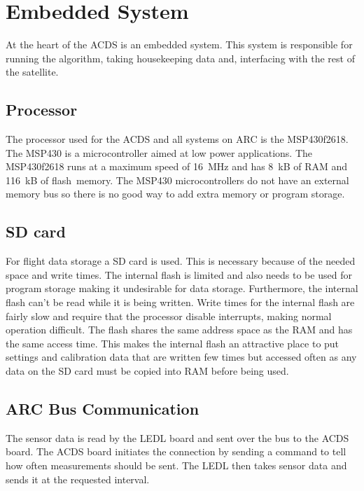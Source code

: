 \section{Embedded System}

At the heart of the \ac{ACDS} is an embedded system. This system is responsible for running the algorithm, taking housekeeping data and, interfacing with the rest of the satellite.

\subsection{Processor}

The processor used for the \ac{ACDS} and all systems on \ac{ARC} is the MSP430f2618. The MSP430 is a microcontroller aimed at low power applications. The MSP430f2618 runs at a maximum speed of 16~MHz and has 8~kB of RAM and 116~kB of flash~memory. The MSP430 microcontrollers do not have an external memory bus so there is no good way to add extra memory or program storage. 

\subsection{SD card}

For flight data storage a SD card is used. This is necessary because of the needed space and write times. The internal flash is limited and also needs to be used for program storage making it undesirable for data storage. Furthermore, the internal flash can't be read while it is being written. Write times for the internal flash are fairly slow and require that the processor disable interrupts, making normal operation difficult. The flash shares the same address space as the \ac{RAM} and has the same access time. This makes the internal flash an attractive place to put settings and calibration data that are written few times but accessed often as any data on the SD card must be copied into \ac{RAM} before being used.

\subsection{\acs{ARC} Bus Communication}

The sensor data is read by the \ac{LEDL} board and sent over the bus to the \ac{ACDS} board. The \ac{ACDS} board initiates the connection by sending a command to tell how often measurements should be sent. The \ac{LEDL} then takes sensor data and sends it at the requested interval.

